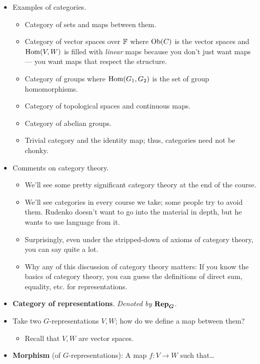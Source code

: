 \documentclass[../notes.tex]{subfiles}
\begin{document}
\begin{itemize}
\begin{itemize}
    \end{itemize}
    \item Examples of categories.
    \begin{itemize}
        \item Category of sets and maps between them.
        \item Category of vector spaces over $\mathbb{F}$ where $\operatorname{Ob}(C)$ is the vector spaces and $\operatorname{Hom}(V,W)$ is filled with \emph{linear} maps because you don't just want maps --- you want maps that respect the structure.
        \item Category of groups where $\operatorname{Hom}(G_1,G_2)$ is the set of group homomorphisms.
        \item Category of topological spaces and continuous maps.
        \item Category of abelian groups.
        \item Trivial category and the identity map; thus, categories need not be chonky.
    \end{itemize}
    \pagebreak
    \item Comments on category theory.
    \begin{itemize}
        \item We'll see some pretty significant category theory at the end of the course.
        \item We'll see categories in every course we take; some people try to avoid them. Rudenko doesn't want to go into the material in depth, but he wants to use language from it.
        \item Surprisingly, even under the stripped-down of axioms of category theory, you can say quite a lot.
        \item Why any of this discussion of category theory matters: If you know the basics of category theory, you can guess the definitions of direct sum, equality, etc. for representations.
    \end{itemize}
    \item \textbf{Category of representations}. \emph{Denoted by} $\bm{\Rep_G}$.
    \item Take two $G$-representations $V,W$; how do we define a map between them?
    \begin{itemize}
        \item Recall that $V,W$ are vector spaces.
    \end{itemize}
    \item \textbf{Morphism} (of $G$-representations): A map $f:V\to W$ such that\dots
    \begin{enumerate}

\end{enumerate}
\end{itemize}
\end{document}
